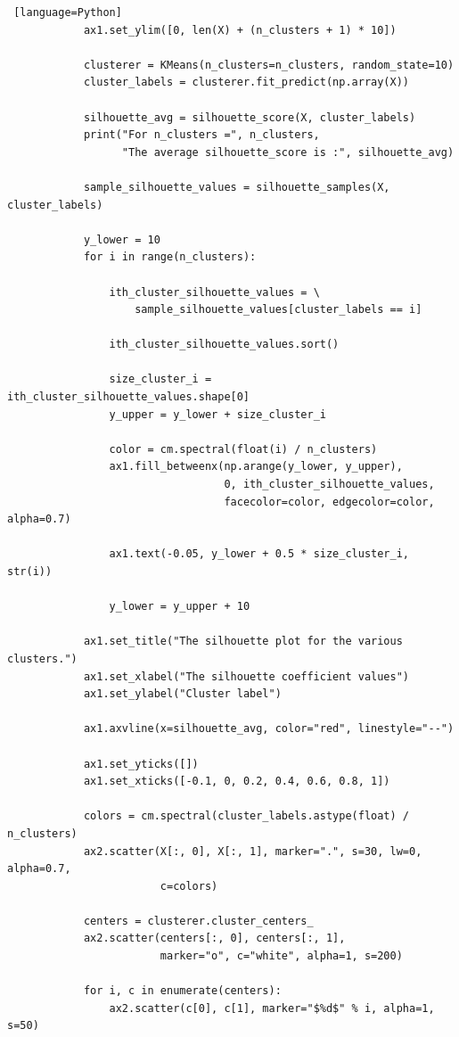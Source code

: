 \documentclass[11pt]{article}
\begin{document}
\begin{lstlisting} [language=Python]
            ax1.set_ylim([0, len(X) + (n_clusters + 1) * 10])

            clusterer = KMeans(n_clusters=n_clusters, random_state=10)
            cluster_labels = clusterer.fit_predict(np.array(X))

            silhouette_avg = silhouette_score(X, cluster_labels)
            print("For n_clusters =", n_clusters,
                  "The average silhouette_score is :", silhouette_avg)

            sample_silhouette_values = silhouette_samples(X, cluster_labels)

            y_lower = 10
            for i in range(n_clusters):

                ith_cluster_silhouette_values = \
                    sample_silhouette_values[cluster_labels == i]

                ith_cluster_silhouette_values.sort()

                size_cluster_i = ith_cluster_silhouette_values.shape[0]
                y_upper = y_lower + size_cluster_i

                color = cm.spectral(float(i) / n_clusters)
                ax1.fill_betweenx(np.arange(y_lower, y_upper),
                                  0, ith_cluster_silhouette_values,
                                  facecolor=color, edgecolor=color, alpha=0.7)

                ax1.text(-0.05, y_lower + 0.5 * size_cluster_i, str(i))

                y_lower = y_upper + 10

            ax1.set_title("The silhouette plot for the various clusters.")
            ax1.set_xlabel("The silhouette coefficient values")
            ax1.set_ylabel("Cluster label")

            ax1.axvline(x=silhouette_avg, color="red", linestyle="--")

            ax1.set_yticks([])
            ax1.set_xticks([-0.1, 0, 0.2, 0.4, 0.6, 0.8, 1])

            colors = cm.spectral(cluster_labels.astype(float) / n_clusters)
            ax2.scatter(X[:, 0], X[:, 1], marker=".", s=30, lw=0, alpha=0.7,
                        c=colors)

            centers = clusterer.cluster_centers_
            ax2.scatter(centers[:, 0], centers[:, 1],
                        marker="o", c="white", alpha=1, s=200)

            for i, c in enumerate(centers):
                ax2.scatter(c[0], c[1], marker="$%d$" % i, alpha=1, s=50)


\end{lstlisting}
\end{document}
